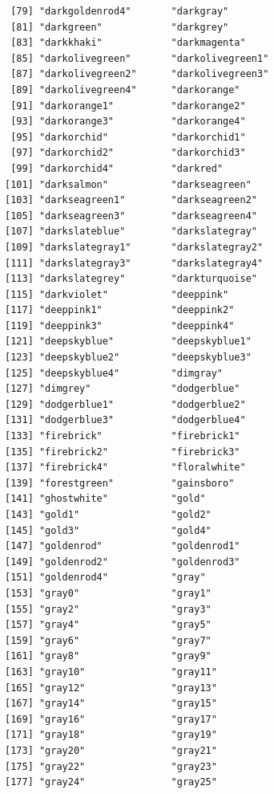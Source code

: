 \documentclass[
  a4paper,
]{article}
\begin{document}
\begin{verbatim}
 [79] "darkgoldenrod4"       "darkgray"            
 [81] "darkgreen"            "darkgrey"            
 [83] "darkkhaki"            "darkmagenta"         
 [85] "darkolivegreen"       "darkolivegreen1"     
 [87] "darkolivegreen2"      "darkolivegreen3"     
 [89] "darkolivegreen4"      "darkorange"          
 [91] "darkorange1"          "darkorange2"         
 [93] "darkorange3"          "darkorange4"         
 [95] "darkorchid"           "darkorchid1"         
 [97] "darkorchid2"          "darkorchid3"         
 [99] "darkorchid4"          "darkred"             
[101] "darksalmon"           "darkseagreen"        
[103] "darkseagreen1"        "darkseagreen2"       
[105] "darkseagreen3"        "darkseagreen4"       
[107] "darkslateblue"        "darkslategray"       
[109] "darkslategray1"       "darkslategray2"      
[111] "darkslategray3"       "darkslategray4"      
[113] "darkslategrey"        "darkturquoise"       
[115] "darkviolet"           "deeppink"            
[117] "deeppink1"            "deeppink2"           
[119] "deeppink3"            "deeppink4"           
[121] "deepskyblue"          "deepskyblue1"        
[123] "deepskyblue2"         "deepskyblue3"        
[125] "deepskyblue4"         "dimgray"             
[127] "dimgrey"              "dodgerblue"          
[129] "dodgerblue1"          "dodgerblue2"         
[131] "dodgerblue3"          "dodgerblue4"         
[133] "firebrick"            "firebrick1"          
[135] "firebrick2"           "firebrick3"          
[137] "firebrick4"           "floralwhite"         
[139] "forestgreen"          "gainsboro"           
[141] "ghostwhite"           "gold"                
[143] "gold1"                "gold2"               
[145] "gold3"                "gold4"               
[147] "goldenrod"            "goldenrod1"          
[149] "goldenrod2"           "goldenrod3"          
[151] "goldenrod4"           "gray"                
[153] "gray0"                "gray1"               
[155] "gray2"                "gray3"               
[157] "gray4"                "gray5"               
[159] "gray6"                "gray7"               
[161] "gray8"                "gray9"               
[163] "gray10"               "gray11"              
[165] "gray12"               "gray13"              
[167] "gray14"               "gray15"              
[169] "gray16"               "gray17"              
[171] "gray18"               "gray19"              
[173] "gray20"               "gray21"              
[175] "gray22"               "gray23"              
[177] "gray24"               "gray25"              

\end{verbatim}
\end{document}
